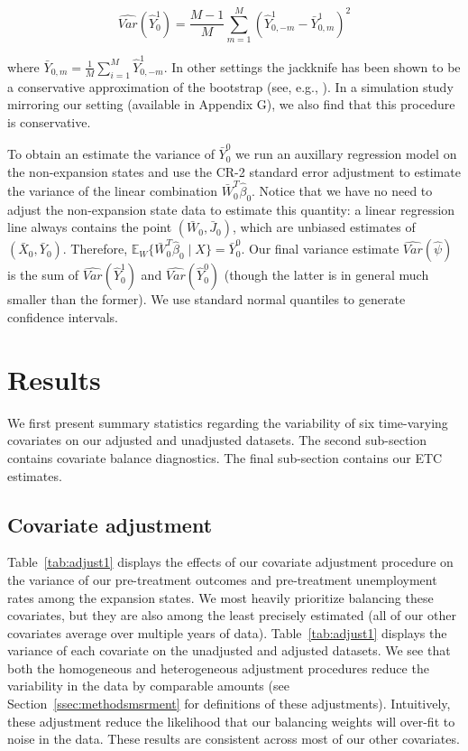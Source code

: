 \documentclass[aoas]{imsart}
\theoremstyle{plain}
\theoremstyle{remark}
\begin{document}
\begin{equation}
    \hat{Var}(\hat{Y}_0^1) = \frac{M - 1}{M}\sum_{m = 1}^M(\hat{Y}^1_{0,-m} - \bar{Y}^1_{0, m})^2
\end{equation}

where $\bar{Y}_{0, m} = \frac{1}{M}\sum_{i=1}^M\hat{Y}^1_{0, -m}$. In other settings the jackknife has been shown to be a conservative approximation of the bootstrap (see, e.g., \cite{efron1981jackknife}). In a simulation study mirroring our setting (available in Appendix G), we also find that this procedure is conservative.

To obtain an estimate the variance of $\bar{Y}_0^0$ we run an auxillary regression model on the non-expansion states and use the CR-2 standard error adjustment to estimate the variance of the linear combination $\bar{W}_0^T\hat{\beta}_0$. Notice that we have no need to adjust the non-expansion state data to estimate this quantity: a linear regression line always contains the point $(\bar{W}_0, \bar{J}_0)$, which are unbiased estimates of $(\bar{X}_0, \bar{Y}_0)$. Therefore, $\mathbb{E}_W\{\bar{W}_0^T\hat{\beta}_0 \mid X\} = \bar{Y}_0^0$. Our final variance estimate $\hat{Var}(\hat{\psi})$ is the sum of $\hat{Var}(\hat{Y}_0^1)$ and $\hat{Var}(\hat{Y}_0^0)$ (though the latter is in general much smaller than the former). We use standard normal quantiles to generate confidence intervals. 

\section{Results}

We first present summary statistics regarding the variability of six time-varying covariates on our adjusted and unadjusted datasets. The second sub-section contains covariate balance diagnostics. The final sub-section contains our ETC estimates.

\subsection{Covariate adjustment}

Table~\ref{tab:adjust1} displays the effects of our covariate adjustment procedure on the variance of our pre-treatment outcomes and pre-treatment unemployment rates among the expansion states. We most heavily prioritize balancing these covariates, but they are also among the least precisely estimated (all of our other covariates average over multiple years of data). Table~\ref{tab:adjust1} displays the variance of each covariate on the unadjusted and adjusted datasets. We see that both the homogeneous and heterogeneous adjustment procedures reduce the variability in the data by comparable amounts (see Section~\ref{ssec:methodsmsrment} for definitions of these adjustments). Intuitively, these adjustment reduce the likelihood that our balancing weights will over-fit to noise in the data. These results are consistent across most of our other covariates.
\end{document}
